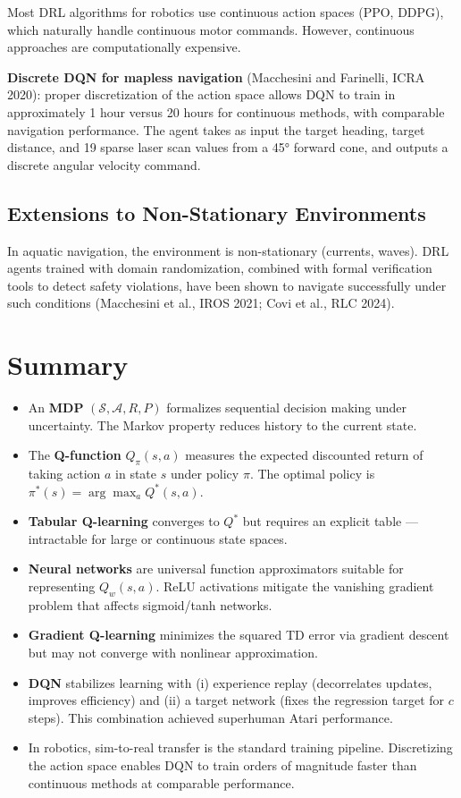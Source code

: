 \documentclass[11pt,a4paper]{article}
\theoremstyle{definition}
\theoremstyle{plain}
\theoremstyle{remark}
\begin{document}
Most DRL algorithms for robotics use continuous action spaces (PPO, DDPG), which naturally handle continuous motor commands. However, continuous approaches are computationally expensive.

\textbf{Discrete DQN for mapless navigation} (Macchesini and Farinelli, ICRA 2020): proper discretization of the action space allows DQN to train in approximately 1 hour versus 20 hours for continuous methods, with comparable navigation performance. The agent takes as input the target heading, target distance, and 19 sparse laser scan values from a 45° forward cone, and outputs a discrete angular velocity command.

\subsection{Extensions to Non-Stationary Environments}

In aquatic navigation, the environment is non-stationary (currents, waves). DRL agents trained with domain randomization, combined with formal verification tools to detect safety violations, have been shown to navigate successfully under such conditions (Macchesini et al., IROS 2021; Covi et al., RLC 2024).

\section{Summary}

\begin{itemize}
    \item An \textbf{MDP} $(\mathcal{S}, \mathcal{A}, R, P)$ formalizes sequential decision making under uncertainty. The Markov property reduces history to the current state.
    \item The \textbf{Q-function} $Q_\pi(s,a)$ measures the expected discounted return of taking action $a$ in state $s$ under policy $\pi$. The optimal policy is $\pi^*(s) = \arg\max_a Q^*(s,a)$.
    \item \textbf{Tabular Q-learning} converges to $Q^*$ but requires an explicit table — intractable for large or continuous state spaces.
    \item \textbf{Neural networks} are universal function approximators suitable for representing $Q_w(s,a)$. ReLU activations mitigate the vanishing gradient problem that affects sigmoid/tanh networks.
    \item \textbf{Gradient Q-learning} minimizes the squared TD error via gradient descent but may not converge with nonlinear approximation.
    \item \textbf{DQN} stabilizes learning with (i) experience replay (decorrelates updates, improves efficiency) and (ii) a target network (fixes the regression target for $c$ steps). This combination achieved superhuman Atari performance.
    \item In robotics, sim-to-real transfer is the standard training pipeline. Discretizing the action space enables DQN to train orders of magnitude faster than continuous methods at comparable performance.
\end{itemize}
\end{document}
